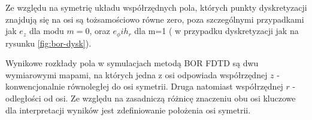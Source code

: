 Ze względu na symetrię układu współrzędnych pola, których punkty dyskretyzacji znajdują się na osi są tożsamościowo równe zero, poza szczególnymi przypadkami jak $e_z$ dla modu $m=0$, oraz $e_{\phi} i h_r$ dla m=1 ( w przypadku dyskretyzacji jak na rysunku \ref{fig:bor-dysk}).

Wynikowe rozkłady pola w symulacjach metodą BOR FDTD są dwu wymiarowymi mapami, na których jedna z osi odpowiada współrzędnej $z$ - konwencjonalnie równoległej do osi symetrii. Druga natomiast współrzędnej $r$ - odległości od osi. Ze względu na zasadniczą różnicę znaczeniu obu osi kluczowe dla interpretacji wyników jest zdefiniowanie położenia osi symetrii.


